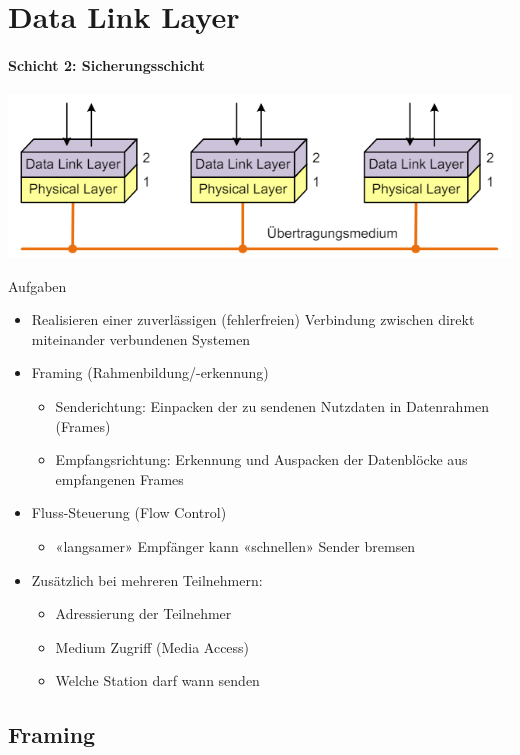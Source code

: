\section{Data Link Layer}
\paragraph{Schicht 2: Sicherungsschicht}
\includegraphics[width=0.7\linewidth]{images/data_link_layer.png}
\begin{definition}{Aufgaben}
    \begin{itemize}
        \item Realisieren einer zuverlässigen (fehlerfreien) Verbindung zwischen direkt miteinander verbundenen Systemen
        \item Framing (Rahmenbildung/-erkennung)
        \begin{itemize}
            \item Senderichtung: Einpacken der zu sendenen Nutzdaten in Datenrahmen (Frames)
            \item Empfangsrichtung: Erkennung und Auspacken der Datenblöcke aus empfangenen Frames
        \end{itemize}
        \item Fluss-Steuerung (Flow Control)
        \begin{itemize}
            \item «langsamer» Empfänger kann «schnellen» Sender bremsen
        \end{itemize}
        \item Zusätzlich bei mehreren Teilnehmern:
        \begin{itemize}
            \item Adressierung der Teilnehmer
            \item Medium Zugriff (Media Access)
            \item Welche Station darf wann senden
        \end{itemize}
    \end{itemize}
\end{definition}

\subsection{Framing}

